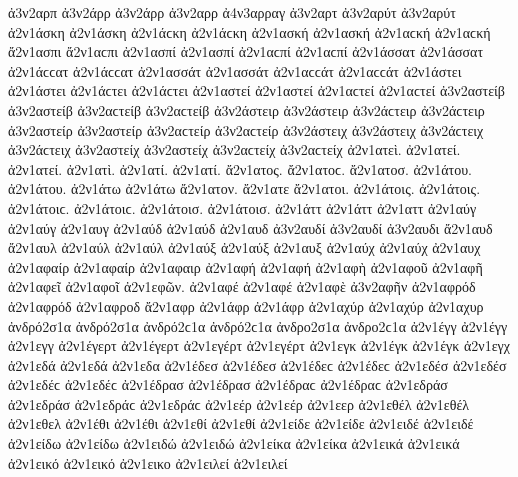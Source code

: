 {ἀ3ν2αρπ   %
ἀ3ν2άρρ ἀ3ν2άρρ   %
ἀ3ν2αρρ 
ἀ4ν3αρραγ   %
ἀ3ν2αρτ   %
ἀ3ν2αρύτ ἀ3ν2αρύτ   %
ἀ2ν1άσκη ἀ2ν1άσκη ἀ2ν1άϲκη ἀ2ν1άϲκη   %
ἀ2ν1ασκή ἀ2ν1ασκή ἀ2ν1αϲκή ἀ2ν1αϲκή 
ἄ2ν1ασπι ἄ2ν1αϲπι   %
ἀ2ν1ασπί ἀ2ν1ασπί ἀ2ν1αϲπί ἀ2ν1αϲπί 
ἀ2ν1άσσατ ἀ2ν1άσσατ ἀ2ν1άϲϲατ ἀ2ν1άϲϲατ   %
ἀ2ν1ασσάτ ἀ2ν1ασσάτ ἀ2ν1αϲϲάτ ἀ2ν1αϲϲάτ 
ἀ2ν1άστει ἀ2ν1άστει ἀ2ν1άϲτει ἀ2ν1άϲτει   %
ἀ2ν1αστεί ἀ2ν1αστεί ἀ2ν1αϲτεί ἀ2ν1αϲτεί 
ἀ3ν2αστείβ ἀ3ν2αστείβ ἀ3ν2αϲτείβ ἀ3ν2αϲτείβ   %
ἀ3ν2άστειρ ἀ3ν2άστειρ ἀ3ν2άϲτειρ ἀ3ν2άϲτειρ   %
ἀ3ν2αστείρ ἀ3ν2αστείρ ἀ3ν2αϲτείρ ἀ3ν2αϲτείρ 
ἀ3ν2άστειχ ἀ3ν2άστειχ ἀ3ν2άϲτειχ ἀ3ν2άϲτειχ   %
ἀ3ν2αστείχ ἀ3ν2αστείχ ἀ3ν2αϲτείχ ἀ3ν2αϲτείχ 
ἀ2ν1ατεὶ.   %
ἀ2ν1ατεί. ἀ2ν1ατεί. 
ἀ2ν1ατὶ.   %
ἀ2ν1ατί. ἀ2ν1ατί. 
ἄ2ν1ατος. ἄ2ν1ατοϲ.   %
ἄ2ν1ατοσ. 
ἀ2ν1άτου. ἀ2ν1άτου. 
ἀ2ν1άτω ἀ2ν1άτω 
ἄ2ν1ατον. 
ἄ2ν1ατε 
ἄ2ν1ατοι. 
ἀ2ν1άτοις. ἀ2ν1άτοις. ἀ2ν1άτοιϲ. ἀ2ν1άτοιϲ. 
ἀ2ν1άτοισ. ἀ2ν1άτοισ. 
ἀ2ν1άττ ἀ2ν1άττ   %
ἀ2ν1αττ 
ἀ2ν1αύγ ἀ2ν1αύγ   %
ἀ2ν1αυγ 
ἀ2ν1αύδ ἀ2ν1αύδ   %
ἀ2ν1αυδ 
ἀ3ν2αυδί ἀ3ν2αυδί   %
ἀ3ν2αυδι 
ἄ2ν1αυδ   %
ἄ2ν1αυλ   %
ἀ2ν1αύλ ἀ2ν1αύλ 
ἀ2ν1αύξ ἀ2ν1αύξ   %
ἀ2ν1αυξ 
ἀ2ν1αύχ ἀ2ν1αύχ   %
ἀ2ν1αυχ 
ἀ2ν1αφαίρ ἀ2ν1αφαίρ   %
ἀ2ν1αφαιρ 
ἀ2ν1αφή ἀ2ν1αφή   %
ἀ2ν1αφὴ 
ἀ2ν1αφοῦ 
ἀ2ν1αφῆ 
ἀ2ν1αφεῖ 
ἀ2ν1αφοῖ 
ἀ2ν1εφῶν. 
ἀ2ν1αφέ ἀ2ν1αφέ 
ἀ2ν1αφὲ 
ἀ3ν2αφῆν   %
ἀ2ν1αφρόδ ἀ2ν1αφρόδ   %
ἀ2ν1αφροδ 
ἄ2ν1αφρ   %
ἀ2ν1άφρ ἀ2ν1άφρ 
ἀ2ν1αχύρ ἀ2ν1αχύρ   %
ἀ2ν1αχυρ 
ἀνδρό2σ1α ἀνδρό2σ1α ἀνδρό2ϲ1α ἀνδρό2ϲ1α   %
ἀνδρο2σ1α ἀνδρο2ϲ1α 
ἀ2ν1έγγ ἀ2ν1έγγ   %
ἀ2ν1εγγ 
ἀ2ν1έγερτ ἀ2ν1έγερτ   %
ἀ2ν1εγέρτ ἀ2ν1εγέρτ 
ἀ2ν1εγκ   %
ἀ2ν1έγκ ἀ2ν1έγκ   %
ἀ2ν1εγχ   %
ἀ2ν1εδά ἀ2ν1εδά   %
ἀ2ν1εδα 
ἀ2ν1έδεσ ἀ2ν1έδεσ ἀ2ν1έδεϲ ἀ2ν1έδεϲ   %
ἀ2ν1εδέσ ἀ2ν1εδέσ ἀ2ν1εδέϲ ἀ2ν1εδέϲ 
ἀ2ν1έδρασ ἀ2ν1έδρασ ἀ2ν1έδραϲ ἀ2ν1έδραϲ   %
ἀ2ν1εδράσ ἀ2ν1εδράσ ἀ2ν1εδράϲ ἀ2ν1εδράϲ 
ἀ2ν1εέρ ἀ2ν1εέρ   %
ἀ2ν1εερ 
ἀ2ν1εθέλ ἀ2ν1εθέλ   %
ἀ2ν1εθελ 
ἀ2ν1έθι ἀ2ν1έθι   %
ἀ2ν1εθί ἀ2ν1εθί 
ἀ2ν1είδε ἀ2ν1είδε   %
ἀ2ν1ειδέ ἀ2ν1ειδέ 
ἀ2ν1είδω ἀ2ν1είδω   %
ἀ2ν1ειδώ ἀ2ν1ειδώ 
ἀ2ν1είκα ἀ2ν1είκα   %
ἀ2ν1εικά ἀ2ν1εικά 
ἀ2ν1εικό ἀ2ν1εικό   %
ἀ2ν1εικο 
ἀ2ν1ειλεί ἀ2ν1ειλεί   %
}
